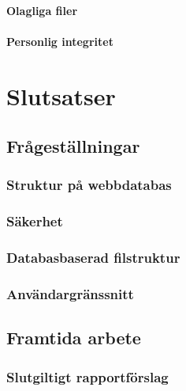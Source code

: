 \documentclass[a4paper,12pt,oneside,final]{extbook}
\begin{document}
\subsubsection{Olagliga filer}

\subsubsection{Personlig integritet}

\chapter{Slutsatser}

\section{Frågeställningar}

\subsection{Struktur på webbdatabas}

\subsection{Säkerhet}

\subsection{Databasbaserad filstruktur}

\subsection{Användargränssnitt}

\section{Framtida arbete}

\subsection{Slutgiltigt rapportförslag}
\end{document}
